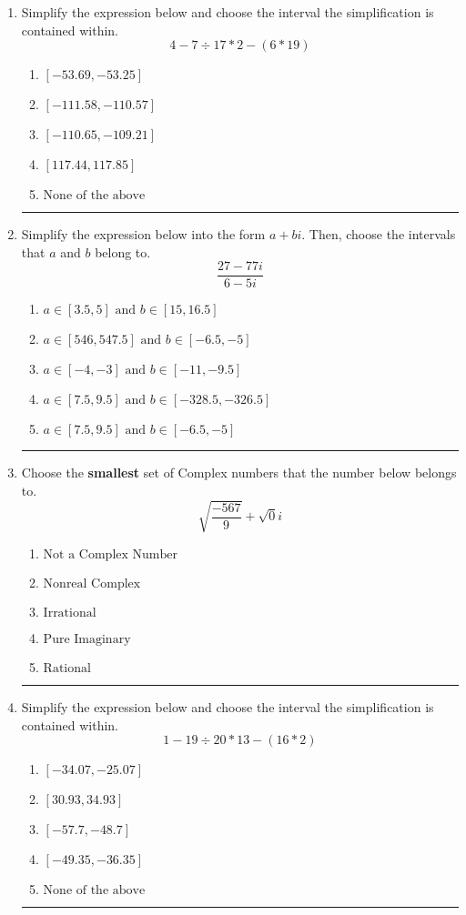 \documentclass[14pt]{extbook}
\newcommand{\litem}[1]{\item#1\hspace*{-1cm}\rule{\textwidth}{0.4pt}}
\begin{document}
\begin{enumerate}
{\begin{enumerate}[label=\Alph*.]
\end{enumerate} }
\litem{
Simplify the expression below and choose the interval the simplification is contained within.\[ 4 - 7 \div 17 * 2 - (6 * 19) \]\begin{enumerate}[label=\Alph*.]
\item \( [-53.69, -53.25] \)
\item \( [-111.58, -110.57] \)
\item \( [-110.65, -109.21] \)
\item \( [117.44, 117.85] \)
\item \( \text{None of the above} \)

\end{enumerate} }
\litem{
Simplify the expression below into the form $a+bi$. Then, choose the intervals that $a$ and $b$ belong to.\[ \frac{27 - 77 i}{6 - 5 i} \]\begin{enumerate}[label=\Alph*.]
\item \( a \in [3.5, 5] \text{ and } b \in [15, 16.5] \)
\item \( a \in [546, 547.5] \text{ and } b \in [-6.5, -5] \)
\item \( a \in [-4, -3] \text{ and } b \in [-11, -9.5] \)
\item \( a \in [7.5, 9.5] \text{ and } b \in [-328.5, -326.5] \)
\item \( a \in [7.5, 9.5] \text{ and } b \in [-6.5, -5] \)

\end{enumerate} }
\litem{
Choose the \textbf{smallest} set of Complex numbers that the number below belongs to.\[ \sqrt{\frac{-567}{9}}+\sqrt{0}i \]\begin{enumerate}[label=\Alph*.]
\item \( \text{Not a Complex Number} \)
\item \( \text{Nonreal Complex} \)
\item \( \text{Irrational} \)
\item \( \text{Pure Imaginary} \)
\item \( \text{Rational} \)

\end{enumerate} }
\litem{
Simplify the expression below and choose the interval the simplification is contained within.\[ 1 - 19 \div 20 * 13 - (16 * 2) \]\begin{enumerate}[label=\Alph*.]
\item \( [-34.07, -25.07] \)
\item \( [30.93, 34.93] \)
\item \( [-57.7, -48.7] \)
\item \( [-49.35, -36.35] \)
\item \( \text{None of the above} \)


\end{enumerate}}
\end{enumerate}
\end{document}
